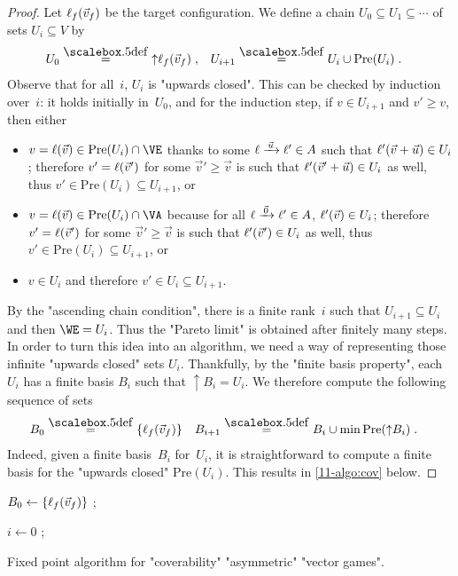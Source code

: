 \begin{proof}
Let $\ell_f(\vec v_f)$ be the target configuration.  We define a
chain $U_0\subseteq U_1\subseteq\cdots$ of sets $U_i\subseteq V$ by
\begin{align*}
  U_0&\eqdef{\uparrow}\loc_f(\vec v_f)\;,&
  U_{i+1}&\eqdef U_i\cup\mathrm{Pre}(U_i)\;.
\end{align*}
Observe that for all~$i$, $U_i$ is "upwards closed".  This can be
checked by induction over~$i$: it holds initially in~$U_0$, and for
the induction step, if $v\in U_{i+1}$ and $v'\geq v$, then either
\begin{itemize}
\item $v=\loc(\vec v)\in\mathrm{Pre}(U_i)\cap\VE$ thanks to some
  $\loc\step{\vec u}\loc'\in\Act$ such that
  $\ell'(\vec v+\vec u)\in U_i$; therefore $v'=\ell(\vec v')$ for some
  $\vec v'\geq \vec v$ is such that $\ell'(\vec v'+\vec u)\in U_i$ as
  well, thus $v'\in \mathrm{Pre}(U_i)\subseteq U_{i+1}$, or
\item $v=\loc(\vec v)\in\mathrm{Pre}(U_i)\cap\VA$ because for all
  $\loc\step{\vec 0}\loc'\in\Act$, $\ell'(\vec v)\in U_i$; therefore
  $v'=\ell(\vec v')$ for some $\vec v'\geq \vec v$ is such that
  $\ell'(\vec v')\in U_i$ as well, thus
  $v'\in \mathrm{Pre}(U_i)\subseteq U_{i+1}$, or
\item $v\in U_i$ and therefore $v'\in U_i\subseteq U_{i+1}$.
\end{itemize}

By the "ascending chain condition", there is a finite rank~$i$ such
that $U_{i+1}\subseteq U_i$ and then $\WE=U_i$.  Thus the
"Pareto limit" is obtained after finitely many steps.
In order to turn this idea into an algorithm, we need a way of
representing those infinite "upwards closed" sets $U_i$.  Thankfully,
by the "finite basis property", each $U_i$ has a finite basis $B_i$
such that ${\uparrow}B_i=U_i$.  We therefore compute the following
sequence of sets
\begin{align*}
  B_0&\eqdef\{\loc_f(\vec v_f)\}&B_{i+1}&\eqdef
                                       B_i\cup\min\mathrm{Pre}({\uparrow}B_i)\;.
\end{align*}
Indeed, given a finite basis~$B_i$ for~$U_i$, it is straightforward to
compute a finite basis for the "upwards closed" $\mathrm{Pre}(U_i)$.
This results in \cref{11-algo:cov} below.
\end{proof}

\begin{algorithm}

$B_0 \leftarrow \{\ell_f(\vec v_f)\}$ ;

$i \leftarrow 0$ ;
     

\caption{Fixed point algorithm for "coverability" "asymmetric" "vector
  games".}
\label{11-algo:cov}
\end{algorithm}

